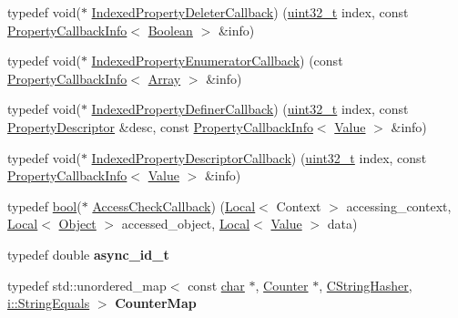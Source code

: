 \begin{DoxyCompactItemize}
\item 
typedef void($\ast$ \mbox{\hyperlink{namespacev8_a53863728de14cde48dd6543207b2f2da}{Indexed\+Property\+Deleter\+Callback}}) (\mbox{\hyperlink{classuint32__t}{uint32\+\_\+t}} index, const \mbox{\hyperlink{classv8_1_1PropertyCallbackInfo}{Property\+Callback\+Info}}$<$ \mbox{\hyperlink{classv8_1_1Boolean}{Boolean}} $>$ \&info)
\item 
typedef void($\ast$ \mbox{\hyperlink{namespacev8_adbb0a6d5537371953f9ba807d4f6275e}{Indexed\+Property\+Enumerator\+Callback}}) (const \mbox{\hyperlink{classv8_1_1PropertyCallbackInfo}{Property\+Callback\+Info}}$<$ \mbox{\hyperlink{classv8_1_1Array}{Array}} $>$ \&info)
\item 
typedef void($\ast$ \mbox{\hyperlink{namespacev8_a967435db933fa9798caac467948499df}{Indexed\+Property\+Definer\+Callback}}) (\mbox{\hyperlink{classuint32__t}{uint32\+\_\+t}} index, const \mbox{\hyperlink{classv8_1_1PropertyDescriptor}{Property\+Descriptor}} \&desc, const \mbox{\hyperlink{classv8_1_1PropertyCallbackInfo}{Property\+Callback\+Info}}$<$ \mbox{\hyperlink{classv8_1_1Value}{Value}} $>$ \&info)
\item 
typedef void($\ast$ \mbox{\hyperlink{namespacev8_a7506e91d70d885b5cbeabdf870ac0e88}{Indexed\+Property\+Descriptor\+Callback}}) (\mbox{\hyperlink{classuint32__t}{uint32\+\_\+t}} index, const \mbox{\hyperlink{classv8_1_1PropertyCallbackInfo}{Property\+Callback\+Info}}$<$ \mbox{\hyperlink{classv8_1_1Value}{Value}} $>$ \&info)
\item 
typedef \mbox{\hyperlink{classbool}{bool}}($\ast$ \mbox{\hyperlink{namespacev8_a1024fb358d107c1494163217830688e6}{Access\+Check\+Callback}}) (\mbox{\hyperlink{classv8_1_1Local}{Local}}$<$ Context $>$ accessing\+\_\+context, \mbox{\hyperlink{classv8_1_1Local}{Local}}$<$ \mbox{\hyperlink{classv8_1_1Object}{Object}} $>$ accessed\+\_\+object, \mbox{\hyperlink{classv8_1_1Local}{Local}}$<$ \mbox{\hyperlink{classv8_1_1Value}{Value}} $>$ data)
\item 
\mbox{\label{namespacev8_af72c18ae3d5d415d235d0c24f0abdb96}} 
typedef double {\bfseries async\+\_\+id\+\_\+t}
\item 
\mbox{\label{namespacev8_a4f9fea1a245ec4e728c72826add26f47}} 
typedef std\+::unordered\+\_\+map$<$ const \mbox{\hyperlink{classchar}{char}} $\ast$, \mbox{\hyperlink{classv8_1_1Counter}{Counter}} $\ast$, \mbox{\hyperlink{structv8_1_1CStringHasher}{C\+String\+Hasher}}, \mbox{\hyperlink{structv8_1_1internal_1_1StringEquals}{i\+::\+String\+Equals}} $>$ {\bfseries Counter\+Map}
\end{DoxyCompactItemize}
